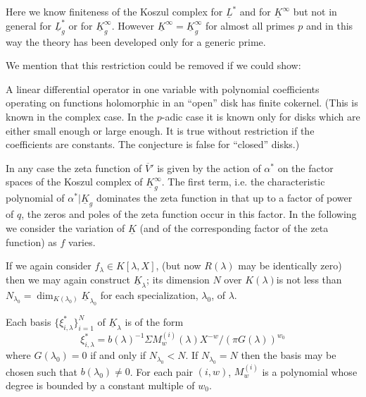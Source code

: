 Here we know finiteness of the Koszul complex for $\underline{L}^{*}$ and for $\underline{K}^{\infty}$ but not in general for $\underline{L}^{*}_{g}$ or for $\underline{K}^{\infty}_{g}$. However $\underline{K}^{\infty}=\underline{K}^{\infty}_{g}$ for almost all primes $p$ and in this way the theory has been developed only for a generic prime.

We mention that this restriction could be removed if we could show:

\begin{conjecture*}
A linear differential operator in one variable with polynomial coefficients operating on functions holomorphic in an ``open'' disk has finite cokernel. (This is known in the complex case. In the $p$-adic case it is known only for disks which are either small enough or large enough. It is true without restriction if the coefficients are constants. The conjecture is false for ``closed'' disks.)
\end{conjecture*}

In any case the zeta function of $\overline{V}'$ is given by the action of $\alpha^{*}$ on the factor spaces of the Koszul complex of $\underline{K}^{\infty}_{g}$. The first term, i.e. the characteristic polynomial of $\alpha^{*}|\underline{K}_{g}$ dominates the zeta function in that up to a factor of power of $q$, the zeros and poles of the zeta function occur in this factor. In the following we consider the variation of $\underline{K}$ (and of the corresponding factor of the zeta function) as $f$ varies.

If we again consider $f_{\lambda}\in K[\lambda,X]$, (but now $R(\lambda)$ may be identically zero) then we may again construct $\underline{K}_{\lambda}$; its dimension $N$ over $K(\lambda)$\pageoriginale is not less than $N_{\lambda_{0}}=\dim_{K(\lambda_{0})}\underline{K}_{\lambda_{0}}$ for each specialization, $\lambda_{0}$, of $\lambda$.

\begin{theorem*}
Each basis $\{\xi^{*}_{i,\lambda}\}^{N}_{i=1}$ of $\underline{K}_{\lambda}$ is of the form
\begin{equation}
\xi^{*}_{i,\lambda}=b(\lambda)^{-1}\Sigma M_{w}^{(i)}(\lambda)X^{-w}/(\pi G(\lambda))^{w_{0}}\label{art07-eq5}
\end{equation}
where $G(\lambda_{0})=0$ if and only if $N_{\lambda_{0}}<N$. If $N_{\lambda_{0}}=N$ then the basis may be chosen such that $b(\lambda_{0})\neq 0$. For each pair $(i,w)$, $M^{(i)}_{w}$ is a polynomial whose degree is bounded by a constant multiple of $w_{0}$.
\end{theorem*}

